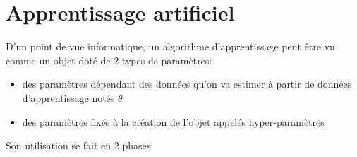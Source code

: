 \section{Apprentissage artificiel}


D'un point de vue informatique, un algorithme d'apprentissage peut être vu comme un objet doté de 2 types de paramètres:
\begin{itemize}
 \item des paramètres dépendant des données qu'on va estimer à partir de données d'apprentissage notés $\theta$
 \item des paramètres fixés à la création de l'objet appelés hyper-paramètres
\end{itemize}
Son utilisation se fait en 2 phases:
